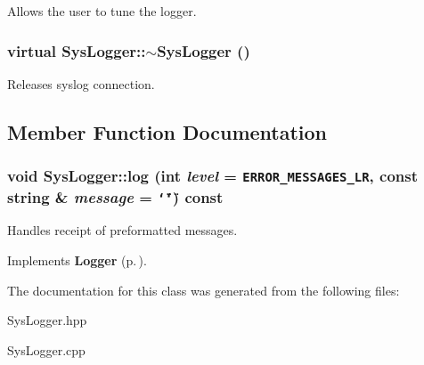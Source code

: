 Allows the user to tune the logger.
\subsubsection{\setlength{\rightskip}{0pt plus 5cm}virtual Sys\-Logger::$\sim$Sys\-Logger ()\hspace{0.3cm}{\tt  [inline, virtual]}}\label{classSysLogger_a1}


Releases syslog connection.

\subsection{Member Function Documentation}
\subsubsection{\setlength{\rightskip}{0pt plus 5cm}void Sys\-Logger::log (int {\em level} = {\tt ERROR\_\-MESSAGES\_\-LR}, const string \& {\em message} = {\tt \char`\"{}\char`\"{}}) const\hspace{0.3cm}{\tt  [virtual]}}\label{classSysLogger_a2}


Handles receipt of preformatted messages.

Implements {\bf Logger} {\rm (p.\,\pageref{classLogger_a2})}.

The documentation for this class was generated from the following files:\begin{CompactItemize}
\item 
Sys\-Logger.hpp\item 
Sys\-Logger.cpp\end{CompactItemize}
